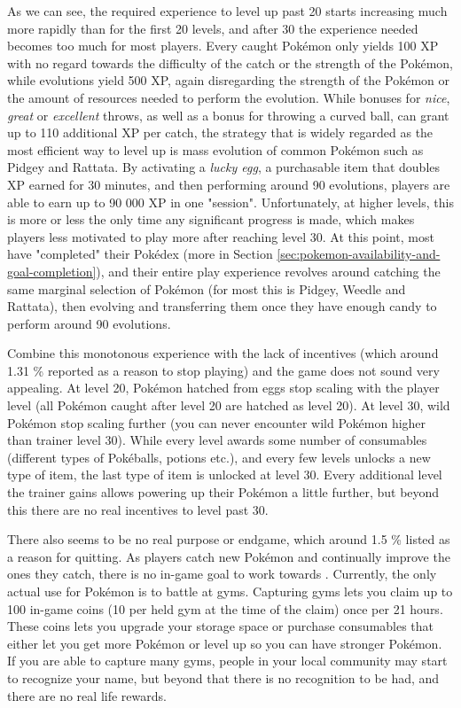 As we can see, the required experience to level up past 20 starts increasing much more rapidly than for the first 20 levels, and after 30 the experience needed becomes too much for most players. Every caught Pokémon only yields 100 XP with no regard towards the difficulty of the catch or the strength of the Pokémon, while evolutions yield 500 XP, again disregarding the strength of the Pokémon or the amount of resources needed to perform the evolution. While bonuses for \emph{nice}, \emph{great} or \emph{excellent} throws, as well as a bonus for throwing a curved ball, can grant up to 110 additional XP per catch, the strategy that is widely regarded as the most efficient way to level up is mass evolution of common Pokémon such as Pidgey and Rattata. By activating a \emph{lucky egg}, a purchasable item that doubles XP earned for 30 minutes, and then performing around 90 evolutions, players are able to earn up to 90 000 XP in one "session". Unfortunately, at higher levels, this is more or less the only time any significant progress is made, which makes players less motivated to play more after reaching level 30. At this point, most have "completed" their Pokédex (more in Section \ref{sec:pokemon-availability-and-goal-completion}), and their entire play experience revolves around catching the same marginal selection of Pokémon (for most this is Pidgey, Weedle and Rattata), then evolving and transferring them once they have enough candy to perform around 90 evolutions.

Combine this monotonous experience with the lack of incentives (which around 1.31 \% reported as a reason to stop playing) and the game does not sound very appealing. At level 20, Pokémon hatched from eggs stop scaling with the player level (all Pokémon caught after level 20 are hatched as level 20). At level 30, wild Pokémon stop scaling further (you can never encounter wild Pokémon higher than trainer level 30). While every level awards some number of consumables (different types of Pokéballs, potions etc.), and every few levels unlocks a new type of item, the last type of item is unlocked at level 30. Every additional level the trainer gains allows powering up their Pokémon a little further, but beyond this there are no real incentives to level past 30.

There also seems to be no real purpose or endgame, which around 1.5 \% listed as a reason for quitting. As players catch new Pokémon and continually improve the ones they catch, there is no in-game goal to work towards . Currently, the only actual use for Pokémon is to battle at gyms. Capturing gyms lets you claim up to 100 in-game coins (10 per held gym at the time of the claim) once per 21 hours. These coins lets you upgrade your storage space or purchase consumables that either let you get more Pokémon or level up so you can have stronger Pokémon. If you are able to capture many gyms, people in your local community may start to recognize your name, but beyond that there is no recognition to be had, and there are no real life rewards.


